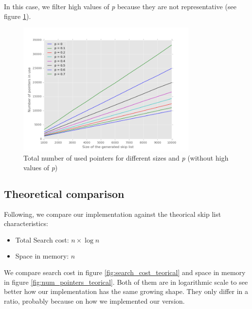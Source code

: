 \documentclass{article}
\begin{document}
In this case, we filter high values of \textit{p} because they are not representative (see figure \ref{fig:num_pointers2}).

\begin{figure}[H]
\begin{center}
    \includegraphics[width=0.8\textwidth]{imgs/pointers2.png}
    \caption{Total number of used pointers for different sizes and \textit{p} (without high values of \textit{p})}
    \label{fig:num_pointers2}
  \end{center}
\end{figure}

\subsection{Theoretical comparison}
Following, we compare our implementation against the theorical skip list characteristics:

\begin{itemize}
    \item Total Search cost: $n\times\log n$
    \item Space in memory: $n$
\end{itemize}

We compare search cost in figure \ref{fig:search_cost_teorical} and space in memory in figure \ref{fig:num_pointers_teorical}. Both of them are in logarithmic scale to see better how our implementation has the same growing shape. They only differ in a ratio, probably because on how we implemented our version.
\end{document}
